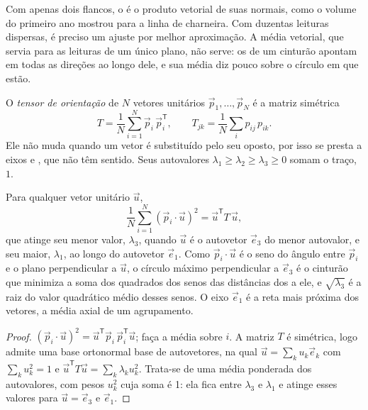 Com apenas dois flancos, o  é o produto vetorial de suas normais, como
o volume do primeiro ano mostrou para a linha de charneira. Com duzentas leituras dispersas,
é preciso um ajuste por melhor aproximação. A média vetorial, que servia para as leituras
de um único plano, não serve: os  de um cinturão apontam em todas as direções ao longo dele, e
sua média diz pouco sobre o círculo em que estão.

\begin{definition}\label{def:b3:structural-analysis:orientation-tensor}
O \emph{tensor de orientação} de $N$ vetores unitários
$\vec p_1, \dots, \vec p_N$ é a matriz simétrica
\[
  T = \frac1N\sum_{i=1}^N \vec p_i\,\vec p_i^{\mathsf T},
  \qquad T_{jk} = \frac1N\sum_i p_{ij}\,p_{ik} .
\]
Ele não muda quando um vetor é substituído pelo seu oposto, por isso se presta
a eixos e , que não têm sentido. Seus autovalores $\lambda_1 \ge \lambda_2
\ge \lambda_3 \ge 0$ somam o traço, $1$.
\end{definition}

\begin{theorem}\label{thm:b3:structural-analysis:tensor}
Para qualquer vetor unitário $\vec u$,
\[
  \frac1N\sum_{i=1}^N (\vec p_i\cdot\vec u)^2 = \vec u^{\mathsf T}T\,\vec u ,
\]
que atinge seu menor valor, $\lambda_3$, quando $\vec u$ é o autovetor
$\vec e_3$ do menor autovalor, e seu maior, $\lambda_1$, ao longo do
autovetor $\vec e_1$. Como $\vec p_i\cdot\vec u$ é o seno do ângulo
entre $\vec p_i$ e o plano perpendicular a $\vec u$, o círculo máximo
perpendicular a $\vec e_3$ é o cinturão que minimiza a soma dos quadrados dos
senos das distâncias dos  a ele, e $\sqrt{\lambda_3}$ é a raiz do
valor quadrático médio desses senos. O eixo $\vec e_1$ é a reta mais próxima dos vetores,
a média axial de um agrupamento.
\end{theorem}

\begin{proof}
$(\vec p_i\cdot\vec u)^2 = \vec u^{\mathsf T}\vec p_i\,\vec p_i^{\mathsf T}\vec
u$; faça a média sobre $i$. A matriz $T$ é simétrica, logo admite uma base ortonormal
base de autovetores, na qual $\vec u = \sum_k u_k\vec e_k$ com $\sum_k
u_k^2 = 1$ e $\vec u^{\mathsf T}T\vec u = \sum_k\lambda_k u_k^2$. Trata-se de uma
média ponderada dos autovalores, com pesos $u_k^2$ cuja soma é 1: ela
fica entre $\lambda_3$ e $\lambda_1$ e atinge esses valores para $\vec u = \vec
e_3$ e $\vec e_1$.
\end{proof}

